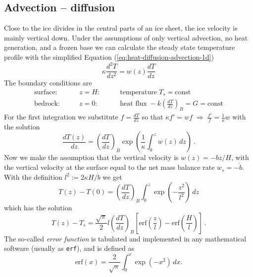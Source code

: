 \documentclass[parskip=half]{scrartcl}
\begin{document}
\subsection{Advection -- diffusion}
\label{sec:advection-diffusion}

Close to the ice divides in the central parts of an ice sheet, the ice
velocity is mainly vertical down.  Under the assumptions of only
vertical advection, no heat generation, and a frozen base we can
calculate the steady state temperature profile with the simplified
Equation (\ref{eq:heat-diffusion-advection-1d})
%
\begin{equation}
 \label{eq:heat-diffusion-advection-1d-steady} \kappa \frac{d^2T}{d
z^2} = w(z) \frac{d T}{d z}
\end{equation}
%
The boundary conditions are
\begin{align*} \text{surface:} \qquad & z=H: &\qquad
\text{temperature}\;T_s = \text{const}\\ \text{bedrock:} \qquad & z=0:
&\qquad \text{heat flux}\;-k \left(\frac{dT}{dz}\right)_{B} = G =
\text{const}
\end{align*}
%
For the first integration we substitute $f = \frac{dT}{dz}$ so that
$\kappa f' = wf \; \Longrightarrow \; \frac{f' }{f} = \frac{1}{\kappa}
w$ with the solution
%
\begin{equation}
 \label{eq:8} \frac{dT(z)}{dz} = \left(\frac{dT}{dz}\right)_{B} \exp
\left( \frac{1}{\kappa} \int_0^z w(z)\, dz \right)\,.
\end{equation}
%
Now we make the assumption that the vertical velocity is $w(z) = -b
z/H$, with the vertical velocity at the surface equal to the net mass
balance rate $w_{s} = -\dot{b}$.  With the definition $l^2 := 2\kappa
H /\dot{b}$ we get
%
\begin{equation}
 \label{eq:10} T(z) - T(0) = \left(\frac{dT}{dz}\right)_{B} \int_0^z
\exp \left(-\frac{z^2}{l^2} \right) \,dz
\end{equation}
%
which has the solution
%
\begin{equation}
 \label{eq:11} T(z) - T_s = \frac{\sqrt\pi}{2} l
\left(\frac{dT}{dz}\right)_{B} \left[ {\textrm{erf}} \left(
\frac{z}{l} \right) - {\textrm{erf}} \left( \frac{H}{l} \right)
\right]\,.
\end{equation}
%
The so-called \emph{error function} is tabulated and implemented in
any mathematical software (usually as \texttt{erf}), and is defined as
%
\begin{equation*}
 \label{eq:12} {\textrm{erf}}(x) = \frac{2}{\sqrt{\pi}} \int_0^x
\exp(-x^2) \, dx.
\end{equation*}
\end{document}
